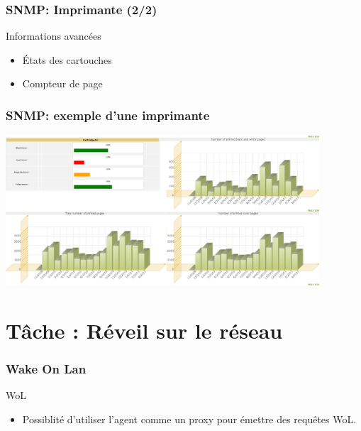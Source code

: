\documentclass{beamer}
\begin{document}
\begin{frame}
    \frametitle{SNMP: Imprimante (2/2)}

    \begin{block}{Informations avancées}
    \begin{itemize}
    \item \'{E}tats des cartouches
    \item Compteur de page
    \end{itemize}
    \end{block}
\end{frame}

\begin{frame}
    \frametitle{SNMP: exemple d'une imprimante}

    \begin{center}
    \includegraphics[width=11.7cm]{./pics/printer_graph.png}
    \end{center}
\end{frame}

\section{Tâche : Réveil sur le réseau}

\begin{frame}
    \frametitle{Wake On Lan}

    \begin{block}{WoL}
    \begin{itemize}
        \item Possiblité d'utiliser l'agent comme un proxy pour émettre des requêtes WoL.
    \end{itemize}
    \end{block}

\end{frame}
\end{document}
